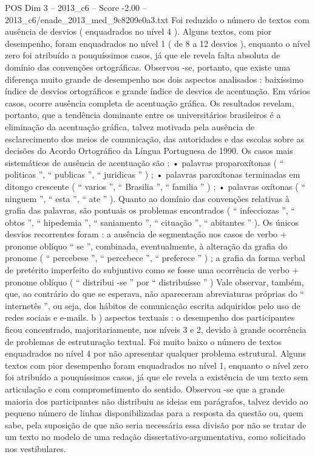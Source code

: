 \begin{textsample}{POS Dim 3 – 2013\_c6 – Score -2.00 – 2013\_c6/enade\_2013\_med\_9c8209e0a3.txt}
Foi reduzido o número de textos com ausência de desvios ( enquadrados no nível 4 ).
Alguns textos, com pior desempenho, foram enquadrados no nível 1 ( de 8 a 12 desvios ), enquanto o nível zero foi atribuído a pouquíssimos casos, já que ele revela falta absoluta de domínio das convenções ortográficas.
Observou -se, portanto, que existe uma diferença muito grande de desempenho nos dois aspectos analisados : baixíssimo índice de desvios ortográficos e grande índice de desvios de acentuação.
Em vários casos, ocorre ausência completa de acentuação gráfica.
Os resultados revelam, portanto, que a tendência dominante entre os universitários brasileiros é a eliminação da acentuação gráfica, talvez motivada pela ausência de esclarecimento dos meios de comunicação, das autoridades e das escolas sobre as decisões do Acordo Ortográfico da Língua Portuguesa de 1990.
Os casos mais sistemáticos de ausência de acentuação são : • palavras proparoxítonas ( “ politicas ”, “ publicas ”, “ juridicas ” ) ; • palavras paroxítonas terminadas em ditongo crescente ( “ varios ”, “ Brasilia ”, “ familia ” ) ; • palavras oxítonas ( “ ninguem ”, “ esta ”, “ ate ” ).
Quanto ao domínio das convenções relativas à grafia das palavras, são pontuais os problemas encontrados ( “ infecciozas ”, “ obtos ”, “ hipedemia ”, “ saniamento ”, “ cituação ”, “ abitantes ” ).
Os únicos desvios recorrentes foram : a ausência de segmentação nos casos de verbo + pronome oblíquo “ se ”, combinada, eventualmente, à alteração da grafia do pronome ( “ percebese ”, “ percebece ”, “ preferece ” ) ; a grafia da forma verbal de pretérito imperfeito do subjuntivo como se fosse uma ocorrência de verbo + pronome oblíquo ( “ distribui -se ” por “ distribuísse ” ) Vale observar, também, que, ao contrário do que se esperava, não apareceram abreviaturas próprias do “ internetês ”, ou seja, dos hábitos de comunicação escrita adquiridos pelo uso de redes sociais e e-mails. b ) aspectos textuais : o desempenho dos participantes ficou concentrado, majoritariamente, nos níveis 3 e 2, devido à grande ocorrência de problemas de estruturação textual.
Foi muito baixo o número de textos enquadrados no nível 4 por não apresentar qualquer problema estrutural.
Alguns textos com pior desempenho foram enquadrados no nível 1, enquanto o nível zero foi atribuído a pouquíssimos casos, já que ele revela a existência de um texto sem articulação e com comprometimento do sentido.
Observou -se que a grande maioria dos participantes não distribuiu as ideias em parágrafos, talvez devido ao pequeno número de linhas disponibilizadas para a resposta da questão ou, quem sabe, pela suposição de que não seria necessária essa divisão por não se tratar de um texto no modelo de uma redação dissertativo-argumentativa, como solicitado nos vestibulares.

\end{textsample}
